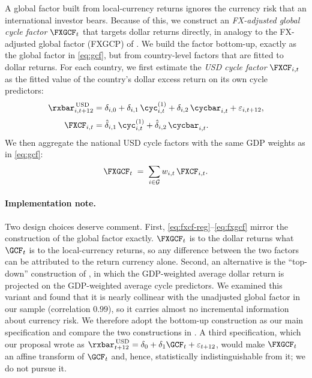 A global factor built from local-currency returns ignores the currency risk
that an international investor bears. Because of this, we construct an
\emph{FX-adjusted global cycle factor} $\FXGCF_{t}$ that targets dollar
returns directly, in analogy to the FX-adjusted global factor (FXGCP) of
\citet{dahlquist2013}. We build the factor bottom-up, exactly as the global
factor in \eqref{eq:gcf}, but from country-level factors that are fitted to
dollar returns. For each country, we first estimate the \emph{USD cycle
factor} $\FXCF_{i,t}$ as the fitted value of the country's dollar excess
return on its own cycle predictors:
\begin{align}
  \rxbar^{\,\mathrm{USD}}_{i,t+12}
     &= \delta_{i,0} + \delta_{i,1}\,\cyc^{(1)}_{i,t}
        + \delta_{i,2}\,\cycbar_{i,t} + \varepsilon_{i,t+12},
        \label{eq:fxcf-reg}\\[2pt]
  \FXCF_{i,t} &= \hat\delta_{i,1}\,\cyc^{(1)}_{i,t}
              + \hat\delta_{i,2}\,\cycbar_{i,t}.
        \label{eq:fxcf}
\end{align}
We then aggregate the national USD cycle factors with the same GDP weights as
in \eqref{eq:gcf}:
\begin{equation}
  \FXGCF_{t} \;=\; \sum_{i\in\mathcal{G}} w_{i,t}\,\FXCF_{i,t}.
  \label{eq:fxgcf}
\end{equation}

\paragraph{Implementation note.} Two design choices deserve comment. First,
\eqref{eq:fxcf-reg}--\eqref{eq:fxgcf} mirror the construction of the global
factor exactly. $\FXGCF_{t}$ is to the dollar returns what $\GCF_{t}$ is to
the local-currency returns, so any difference between the two factors can be
attributed to the return currency alone. Second, an alternative is the
``top-down'' construction of \citet{dahlquist2013}, in which the GDP-weighted
average dollar return is projected on the GDP-weighted average cycle
predictors. We examined this variant and found that it is nearly collinear
with the unadjusted global factor in our sample (correlation $0.99$), so it
carries almost no incremental information about currency risk. We therefore
adopt the bottom-up construction as our main specification and compare the
two constructions in . A third
specification, which our proposal wrote as
$\rxbar^{\,\mathrm{USD}}_{t+12}=\delta_{0}+\delta_{1}\GCF_{t}+\varepsilon_{t+12}$,
would make $\FXGCF_{t}$ an affine transform of $\GCF_{t}$ and, hence,
statistically indistinguishable from it; we do not pursue it.

